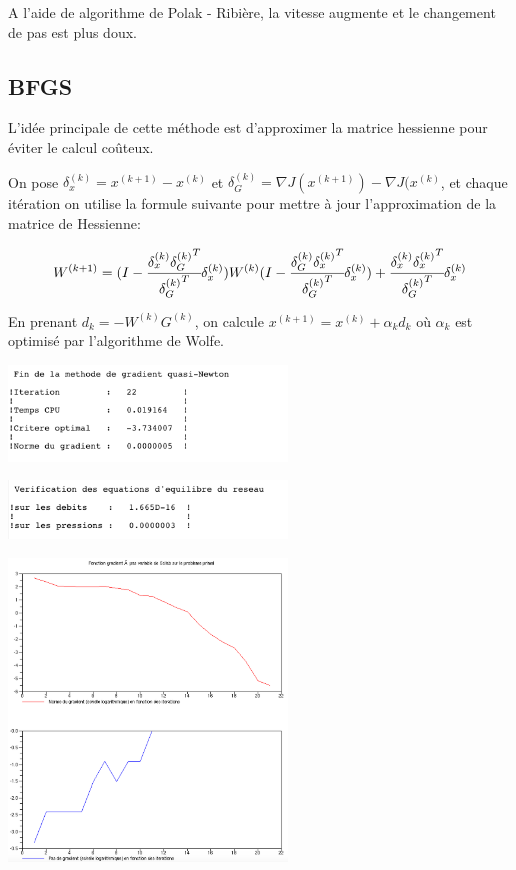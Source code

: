 A l'aide de algorithme de Polak - Ribière, la vitesse augmente et le changement de pas est plus doux.

\subsection{BFGS}

L'idée principale de cette méthode est d'approximer la matrice hessienne pour éviter le calcul coûteux.

On pose $\delta_x^{(k)} = x^{(k+1)} - x^{(k)}$ et $\delta_G^{(k)} = \nabla J(x^{(k+1)}) - \nabla J(x^{(k)}$, et chaque itération on utilise la formule suivante pour mettre à jour l'approximation de la matrice de Hessienne:

$$W^{(k+1)} = (I - \cfrac{\delta_x^{(k)} {\delta_G^{(k)}}^T}{{\delta_G^{(k)}}^T} \delta_x^{(k)}) W^{(k)} (I - \cfrac{\delta_G^{(k)} {\delta_x^{(k)}}^T}{{\delta_G^{(k)}}^T} \delta_x^{(k)}) + \cfrac{\delta_x^{(k)} {\delta_x^{(k)}}^T}{{\delta_G^{(k)}}^T} \delta_x^{(k)}$$

En prenant $d_k = - W^{(k)} G^{(k)}$, on calcule $x^{(k+1)} = x^{(k)} + \alpha_k d_k$ où $\alpha_k$ est optimisé par l'algorithme de Wolfe.

\begin{center}
  \includegraphics[width=20em]{quasi.png}
  
  \includegraphics[width=20em]{quasi_v.png}

  \includegraphics[width=20em]{quasi_f.png}
\end{center}

